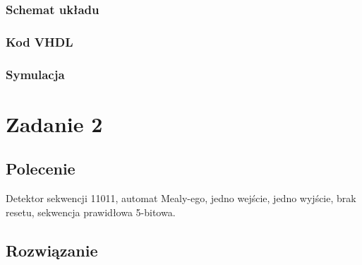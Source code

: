 \documentclass[a4paper,12pt]{extarticle}  %
\begin{document}
\subsubsection{Schemat układu}
\begin{figure}[H]
	\centering
\end{figure}
\subsubsection{Kod VHDL}

\subsubsection{Symulacja}
\begin{figure}[H]
	\centering
\end{figure}
\section{Zadanie 2}
\subsection{Polecenie}
Detektor sekwencji 11011, automat Mealy-ego, jedno wejście, jedno wyjście, brak resetu, sekwencja prawidłowa 5-bitowa.
\subsection{Rozwiązanie}
\end{document}
